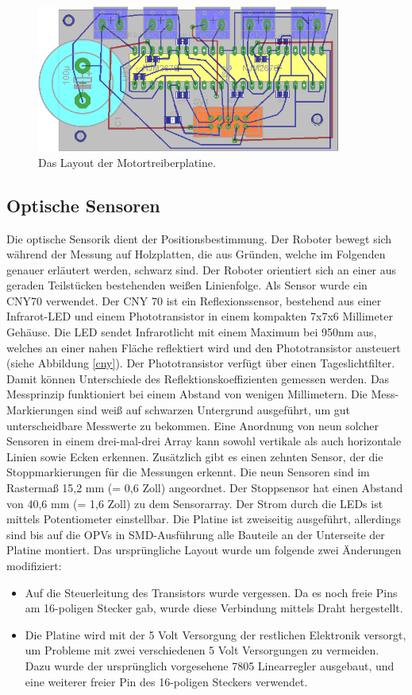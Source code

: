 \documentclass[a4paper,bibtotoc,oneside]{scrbook}
\begin{document}
\begin{figure}[htbp]
\centering
\includegraphics[width=100mm]{img/hdrive.png}
\caption{Das Layout der Motortreiberplatine.}\label{hbridge2}
\end{figure}

\FloatBarrier

\subsection{Optische Sensoren}\thispagestyle{empty}
Die optische Sensorik dient der Positionsbestimmung. Der Roboter bewegt sich während der Messung auf Holzplatten, die aus Gründen, welche im Folgenden genauer erläutert werden, schwarz sind. Der Roboter orientiert sich an einer aus geraden Teilstücken bestehenden weißen Linienfolge. 
Als Sensor wurde ein CNY70 \cite{cny} verwendet. Der CNY 70 ist ein Reflexionssensor, bestehend aus einer Infrarot-LED und einem Phototransistor in einem kompakten 7x7x6 Millimeter Gehäuse. Die LED sendet Infrarotlicht mit einem Maximum bei 950nm aus, welches an einer nahen Fläche reflektiert wird und den Phototransistor ansteuert (siehe Abbildung \ref{cny}). Der Phototransistor verfügt über einen Tageslichtfilter. Damit können Unterschiede des Reflektionskoeffizienten gemessen werden. Das Messprinzip funktioniert bei einem Abstand von wenigen Millimetern.  Die Mess-Markierungen sind weiß auf schwarzen Untergrund ausgeführt, um gut unterscheidbare Messwerte zu bekommen. Eine Anordnung von neun solcher Sensoren in einem drei-mal-drei Array kann sowohl vertikale als auch horizontale Linien sowie Ecken erkennen. Zusätzlich gibt es einen zehnten Sensor, der die Stoppmarkierungen für die Messungen erkennt.
Die neun Sensoren sind im Rastermaß 15,2 mm (= 0,6 Zoll) angeordnet. Der Stoppsensor hat einen Abstand von 40,6 mm (= 1,6 Zoll) zu dem Sensorarray. 
Der Strom durch die LEDs ist mittels Potentiometer einstellbar. 
Die Platine ist zweiseitig ausgeführt, allerdings sind bis auf die OPVs in SMD-Ausführung alle Bauteile an der Unterseite der Platine montiert. Das ursprüngliche Layout wurde um folgende zwei Änderungen modifiziert:
\begin{itemize}
\item Auf die Steuerleitung des Transistors wurde vergessen. Da es noch freie Pins am 16-poligen Stecker gab, wurde diese Verbindung mittels Draht hergestellt.
\item Die Platine wird mit der 5 Volt Versorgung der restlichen Elektronik versorgt, um Probleme mit zwei verschiedenen 5 Volt Versorgungen zu vermeiden. Dazu wurde der ursprünglich vorgesehene 7805 Linearregler ausgebaut, und eine weiterer freier Pin des 16-poligen Steckers verwendet.
\end{itemize}
\end{document}

